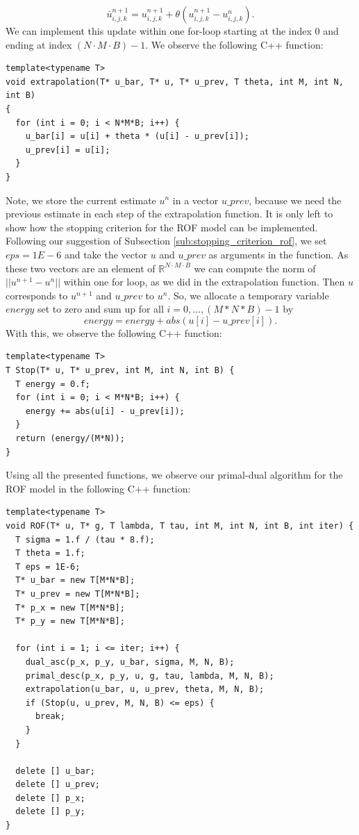 \documentclass[abstracton]{scrreprt}
\begin{document}
                    $$
                        \bar{u}^{n+1}_{i,j,k} = u^{n+1}_{i,j,k} + \theta (u^{n+1}_{i,j,k} - u^{n}_{i,j,k}).
                    $$
                We can implement this update within one for-loop starting at the index $0$ and ending at index $(N \cdot M \cdot B)-1$. We observe the following C++ function:
                \begin{lstlisting}
template<typename T>
void extrapolation(T* u_bar, T* u, T* u_prev, T theta, int M, int N, int B)
{
  for (int i = 0; i < N*M*B; i++) {
    u_bar[i] = u[i] + theta * (u[i] - u_prev[i]);
    u_prev[i] = u[i];
  }
}
                \end{lstlisting}
                Note, we store the current estimate $u^{n}$ in a vector $u\_prev$, because we need the previous estimate in each step of the extrapolation function. It is only left to show how the stopping criterion for the ROF model can be implemented. Following our suggestion of Subsection \ref{sub:stopping_criterion_rof}, we set $eps = 1E-6$ and take the vector $u$ and $u\_prev$ as arguments in the function. As these two vectors are an element of $\mathbb{R}^{N \cdot M \cdot B}$ we can compute the norm of $||u^{n+1} - u^{n}||$ within one for loop, as we did in the extrapolation function. Then $u$ corresponds to $u^{n+1}$ and $u\_prev$ to $u^{n}$. So, we allocate a temporary variable $energy$ set to zero and sum up for all $i = 0, ..., (M*N*B)-1$ by
                    $$
                        energy = energy + abs(u[i] - u\_prev[i]).
                    $$
                With this, we observe the following C++ function:
                \begin{lstlisting}
template<typename T>
T Stop(T* u, T* u_prev, int M, int N, int B) {
  T energy = 0.f;
  for (int i = 0; i < M*N*B; i++) {
    energy += abs(u[i] - u_prev[i]);
  }
  return (energy/(M*N));
}
                \end{lstlisting}
                Using all the presented functions, we observe our primal-dual algorithm for the ROF model in the following C++ function:
                \begin{lstlisting}
template<typename T>
void ROF(T* u, T* g, T lambda, T tau, int M, int N, int B, int iter) {
  T sigma = 1.f / (tau * 8.f);
  T theta = 1.f;
  T eps = 1E-6;
  T* u_bar = new T[M*N*B];
  T* u_prev = new T[M*N*B];
  T* p_x = new T[M*N*B];
  T* p_y = new T[M*N*B];
  
  for (int i = 1; i <= iter; i++) {
    dual_asc(p_x, p_y, u_bar, sigma, M, N, B);
    primal_desc(p_x, p_y, u, g, tau, lambda, M, N, B);
    extrapolation(u_bar, u, u_prev, theta, M, N, B);
    if (Stop(u, u_prev, M, N, B) <= eps) {
      break;
    }
  }

  delete [] u_bar;
  delete [] u_prev;
  delete [] p_x;
  delete [] p_y;
}
                \end{lstlisting}
\end{document}
